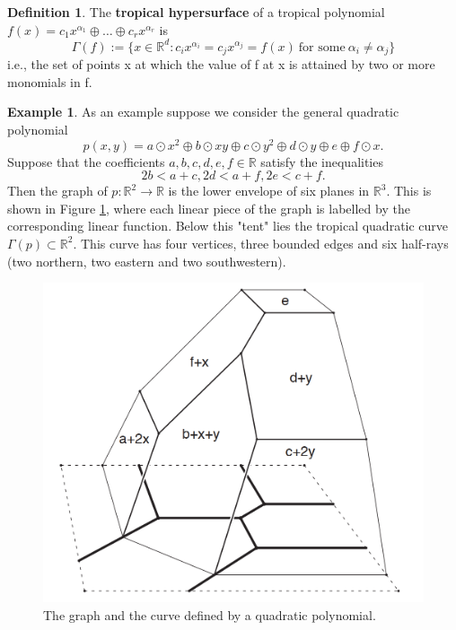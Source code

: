 \documentclass{article}
\theoremstyle{definition}
\newtheorem{definition}[theorem]{Definition}
\newtheorem{example}[theorem]{Example}
\newcommand*{\figuretitle}[1]{%
    {\centering%
    \textbf{#1}%
    \par\medskip}%
}
\begin{document}
\begin{definition}\cite[p.~3]{zhang2018tropical}
The \textbf{tropical hypersurface} of a tropical polynomial $f(x) = c_1 x^{\alpha_1} \oplus \dots \oplus c_r x^{\alpha_r}$ is 
$$\Gamma(f) := \{ x \in \mathbb{R}^{d} : c_i x^{\alpha_i} = c_j x^{\alpha_j} = f(x) \ \text{for some} \ \alpha_i \neq \alpha_j \}$$
i.e., the set of points x at which the value of f at x is attained by two or more monomials in f.
\end{definition}

\begin{example}\cite[p.~23]{maclagan2015introduction}
As an example suppose we consider the general quadratic polynomial
$$p(x, y) = a \odot x^{2} \oplus b \odot xy \oplus c \odot y^{2} \oplus d \odot y \oplus e \oplus f \odot x.$$
Suppose that the coefficients $a,b,c,d,e,f \in \mathbb{R}$ satisfy the inequalities
$$2b < a+c, 2d < a + f, 2e < c + f.$$
Then the graph of $p:\mathbb{R}^{2} \to \mathbb{R}$ is the lower envelope of six planes in $\mathbb{R}^{3}$. This is shown in Figure \ref{fig:quad_trop_var}, where each linear piece of the graph is labelled by the corresponding linear function. Below this "tent" lies the tropical quadratic curve $\Gamma(p) \subset \mathbb{R}^{2}$. This curve has four vertices, three bounded edges and six half-rays (two northern, two eastern and two southwestern).
\end{example}

\begin{figure}[H]
\centering
\includegraphics[scale=0.5]{graphics/quad_trop_pol_proj.PNG}
\caption{The graph and the curve defined by a quadratic polynomial.\cite[p.~22]{maclagan2015introduction}}
\label{fig:quad_trop_var}
\end{figure}
\end{document}
